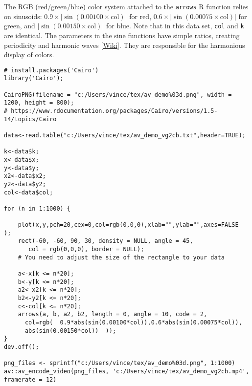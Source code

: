 \documentclass[10pt]{article}
\begin{document}
The RGB (red/green/blue) color system attached to the \texttt{arrows} R function relies on sinusoids: $0.9\times |\sin(0.00100 \times \mbox{col})|$ for red,
 $0.6\times |\sin(0.00075 \times\mbox{col})|$ for green, and  $|\sin(0.00150 \times\mbox{col})|$ for blue. Note that in this data set, \texttt{col} and \texttt{k} are
identical. The parameters in the sine functions have simple ratios, creating periodicity and harmonic waves [\href{https://en.wikipedia.org/wiki/Harmonic}{Wiki}]. They are responsible for the harmonious display of colors.
\quad 
\begin{lstlisting}
# install.packages('Cairo')
library('Cairo');

CairoPNG(filename = "c:/Users/vince/tex/av_demo%03d.png", width = 1200, height = 800); 
# https://www.rdocumentation.org/packages/Cairo/versions/1.5-14/topics/Cairo

data<-read.table("c:/Users/vince/tex/av_demo_vg2cb.txt",header=TRUE);

k<-data$k;
x<-data$x;   
y<-data$y;  
x2<-data$x2;   
y2<-data$y2; 
col<-data$col; 

for (n in 1:1000) {

    plot(x,y,pch=20,cex=0,col=rgb(0,0,0),xlab="",ylab="",axes=FALSE  );
    rect(-60, -60, 90, 30, density = NULL, angle = 45,
       col = rgb(0,0,0), border = NULL);
    # You need to adjust the size of the rectangle to your data

    a<-x[k <= n*20];
    b<-y[k <= n*20];
    a2<-x2[k <= n*20];
    b2<-y2[k <= n*20];
    c<-col[k <= n*20];
    arrows(a, b, a2, b2, length = 0, angle = 10, code = 2,
      col=rgb(  0.9*abs(sin(0.00100*col)),0.6*abs(sin(0.00075*col)),
      abs(sin(0.00150*col))  ));
}
dev.off();

png_files <- sprintf("c:/Users/vince/tex/av_demo%03d.png", 1:1000)
av::av_encode_video(png_files, 'c:/Users/vince/tex/av_demo_vg2cb.mp4', framerate = 12)
\end{lstlisting}

\end{document}

